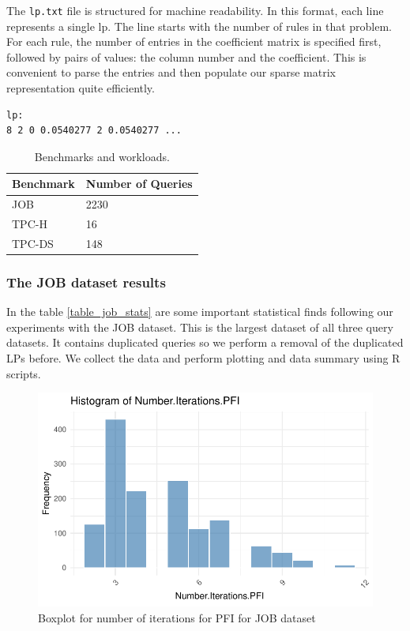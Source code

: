 The \texttt{lp.txt} file is structured for machine readability.
In this format, each line represents a single \gls{lp}. The line starts with
the number of rules in that problem. For each rule, the number of entries in
the coefficient matrix is specified first, followed by pairs of values:
the column number and the coefficient. This is convenient to parse the entries
and then populate our sparse matrix representation quite efficiently.

\begin{lstlisting}
lp:
8 2 0 0.0540277 2 0.0540277 ...
\end{lstlisting} \label{format_input}

\begin{table}[!htb]
    \centering
    \caption{Benchmarks and workloads.}
    \begin{tabular}{|l|l|}
        \hline
        Benchmark                                & Number of Queries \\
        \hline
        JOB \parencite{10.14778/2850583.2850594} & 2230              \\
        TPC-H \parencite{tpch}                   & 16                \\
        TPC-DS \parencite{tpcds2022}             & 148               \\
        \hline
    \end{tabular}
\end{table}

\subsubsection{The JOB dataset results}
In the table \ref{table_job_stats} are some important statistical finds following our
experiments with the JOB dataset.
This is the largest dataset of all three query datasets. It contains duplicated queries so we
perform a removal of the duplicated LPs before. We collect the data and perform plotting and data summary
using R scripts.

\begin{figure}[!htb]
    \centering
    \includegraphics[width=\textwidth]{figures/histo_iter_pfi.pdf}
    \caption{Boxplot for number of iterations for PFI for JOB dataset}
    \label{fig:num_iter_boxplot_pfi_job}
\end{figure}

